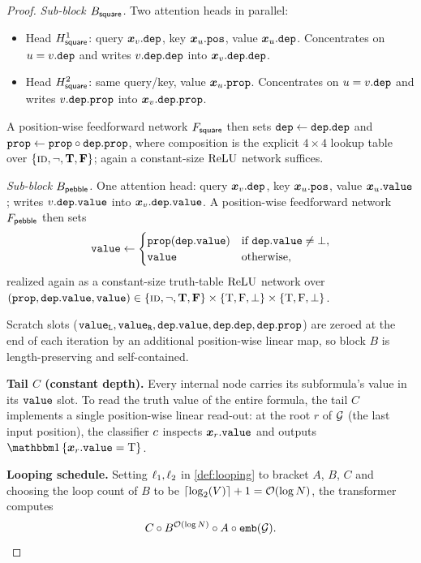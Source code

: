 \documentclass{article}
\begin{document}
\begin{proof}
    \emph{Sub-block $B_{{\textsf{square}}}$.}
    Two attention heads in parallel:
    \begin{itemize}[noitemsep,topsep=0pt,leftmargin=15pt,parsep=0pt]
        \item Head $H^{1}_{{\textsf{square}}}$: query ${{{ \bm{x}}}}_v.{\mathtt{dep}}$, key ${{{ \bm{x}}}}_u.{\mathtt{pos}}$, value ${{{ \bm{x}}}}_u.{\mathtt{dep}}$. Concentrates on $u = v.{\mathtt{dep}}$ and writes $v.{\mathtt{dep}}.{\mathtt{dep}}$ into ${{{ \bm{x}}}}_v.{\mathtt{dep.dep}}$.
        \item Head $H^{2}_{{\textsf{square}}}$: same query/key, value ${{{ \bm{x}}}}_u.{\mathtt{prop}}$. Concentrates on $u = v.{\mathtt{dep}}$ and writes $v.{\mathtt{dep}}.{\mathtt{prop}}$ into ${{{ \bm{x}}}}_v.{\mathtt{dep.prop}}$.
    \end{itemize}
    A position-wise feedforward network $F_{{\textsf{square}}}$ then sets ${\mathtt{dep}} \gets {\mathtt{dep.dep}}$ and ${\mathtt{prop}} \gets {\mathtt{prop}} \circ {\mathtt{dep.prop}}$, where composition is the explicit $4 \times 4$ lookup table over ${{\{ \textsc{id}, \neg, \mathbf{T}, \mathbf{F} \}}}$; again a constant-size ${{ \mathrm{ReLU}}}$ network suffices.
    
    \emph{Sub-block $B_{{\textsf{pebble}}}$.}
    One attention head: query ${{{ \bm{x}}}}_v.{\mathtt{dep}}$, key ${{{ \bm{x}}}}_u.{\mathtt{pos}}$, value ${{{ \bm{x}}}}_u.{\mathtt{value}}$; writes $v.{\mathtt{dep}}.{\mathtt{value}}$ into ${{{ \bm{x}}}}_v.{\mathtt{dep.value}}$.
    A position-wise feedforward network $F_{{\textsf{pebble}}}$ then sets
    \begin{equation*}
        {\mathtt{value}} \gets \begin{cases} {\mathtt{prop}}({\mathtt{dep.value}}) & \text{if } {\mathtt{dep.value}} \neq \bot, \\ {\mathtt{value}} & \text{otherwise,} \end{cases}
    \end{equation*}
    realized again as a constant-size truth-table ${{ \mathrm{ReLU}}}$ network over $({\mathtt{prop}}, {\mathtt{dep.value}}, {\mathtt{value}}) \in {{\{ \textsc{id}, \neg, \mathbf{T}, \mathbf{F} \}}} \times {{\{ {\mathbin{\mathrm{T}}},{\mathbin{\mathrm{F}}},\bot \}}} \times {{\{ {\mathbin{\mathrm{T}}},{\mathbin{\mathrm{F}}},\bot \}}}$.
    
    Scratch slots (${\mathtt{value}_\mathtt{L}}, {\mathtt{value}_\mathtt{R}}, {\mathtt{dep.value}}, {\mathtt{dep.dep}}, {\mathtt{dep.prop}}$) are zeroed at the end of each iteration by an additional position-wise linear map, so block $B$ is length-preserving and self-contained.
    
    \textbf{Tail $C$ (constant depth).}
    Every internal node carries its subformula's value in its ${\mathtt{value}}$ slot.
    To read the truth value of the entire formula, the tail $C$ implements a single position-wise linear read-out: at the root $r$ of ${ \mathcal{G}}$ (the last input position), the classifier ${{ c}}$ inspects ${{{ \bm{x}}}}_r.{\mathtt{value}}$ and outputs $\ind{\vx_r.\fval = \true}$.
    
    \textbf{Looping schedule.}
    Setting ${\ell}_1, {\ell}_2$ in \cref{def:looping} to bracket $A$, $B$, $C$ and choosing the loop count of $B$ to be $\lceil \log_2(V) \rceil + 1 = {{ \mathcal{O}}}(\log {{ N}})$, the transformer computes
    \begin{equation*}
        C \circ B^{{{ \mathcal{O}}}(\log {{ N}})} \circ A \circ {\texttt{emb}}({ \mathcal{G}}).
    \end{equation*}
    

\end{proof}
\end{document}
